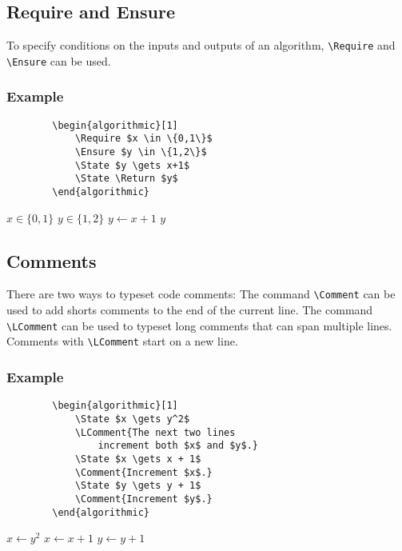 \documentclass[11pt,a4paper,USenglish]{article}
\begin{document}
\subsection{Require and Ensure}
To specify conditions on the inputs and outputs of an algorithm, \verb|\Require| and \verb|\Ensure| can be used.

\subsubsection*{Example}
\begin{minipage}[t]{0.45\textwidth}
	\begin{verbatim}
		\begin{algorithmic}[1]
		    \Require $x \in \{0,1\}$
		    \Ensure $y \in \{1,2\}$
		    \State $y \gets x+1$
		    \State \Return $y$
		\end{algorithmic}
	\end{verbatim}
\end{minipage}
\hfill
\begin{minipage}[t]{0.45\textwidth}
	\begin{algorithmic}[1]
		\Require $x \in \{0,1\}$
		\Ensure $y \in \{1,2\}$
		\State $y \gets x+1$
		\State \Return $y$
	\end{algorithmic}
\end{minipage}


\subsection{Comments}
There are two ways to typeset code comments: The command \verb|\Comment| can be used to add shorts comments to the end of the current line. The command \verb|\LComment| can be used to typeset long comments that can span multiple lines. Comments with \verb|\LComment| start on a new line.

\subsubsection*{Example}
\begin{minipage}[t]{0.45\textwidth}
	\begin{verbatim}
		\begin{algorithmic}[1]
		    \State $x \gets y^2$
		    \LComment{The next two lines
		        increment both $x$ and $y$.}
		    \State $x \gets x + 1$
		    \Comment{Increment $x$.}
		    \State $y \gets y + 1$
		    \Comment{Increment $y$.}
		\end{algorithmic}
	\end{verbatim}
\end{minipage}
\hfill
\begin{minipage}[t]{0.45\textwidth}
	\begin{algorithmic}[1]
		\State $x \gets y^2$
		\State $x \gets x + 1$
		\State $y \gets y + 1$
	\end{algorithmic}
\end{minipage}
\end{document}
